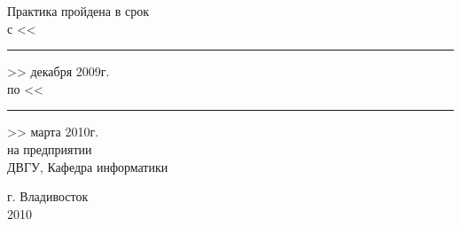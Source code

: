 \documentclass[a4paper,14pt]{extarticle} %
\begin{document}
\begin{titlepage}
{\begin{multicols}{2}
    \bigskip

    Практика пройдена в срок \\
    с <<\rule{1cm}{0.5pt}>> декабря 2009г. \\
    по <<\rule{1cm}{0.5pt}>> марта 2010г. \\
    на предприятии \\
    ДВГУ, Кафедра информатики \\

\end{multicols}

\vfill

\begin{center}
    г. Владивосток\\
    2010
\end{center}
}
\end{titlepage} %

\setcounter{page}{2}
\begin{center}
\renewcommand{\contentsname}{Оглавление}
\tableofcontents %
\end{center}

\newpage











\end{document}
